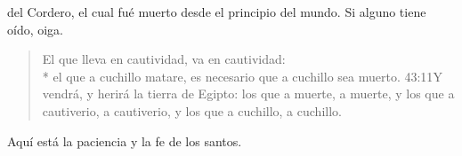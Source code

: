  del Cordero, el cual fué muerto desde el principio del mundo.
Si alguno tiene oído, oiga. 
\begin{verse}
El que lleva en cautividad, va en cautividad:\\* el que a cuchillo matare, es necesario que a cuchillo sea muerto.%
					{43:11}{Y vendrá, y herirá la tierra de Egipto: los que a muerte, a muerte, y los que a cautiverio, a cautiverio, y los que a cuchillo, a cuchillo.}%
\end{verse}

\noindent
Aquí está la paciencia y la fe de los santos.
